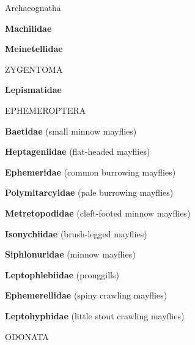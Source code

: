 \documentclass[letterpaper,10pt]{article}
\begin{document}
	
\newcommand*{\mybox}[1]{\framebox{#1}}	

\scriptsize{

%
%
%

%
%
%
\makebox[0.0cm]{}  Archaeognatha \par

\makebox[0.6cm]{}  \textbf{Machilidae} \par
\makebox[0.6cm]{}  \textbf{Meinetellidae} \par
%
%
%
\makebox[0.0cm]{}  ZYGENTOMA \par
\makebox[0.6cm]{}  \textbf{Lepismatidae} \par
%
%
%
\makebox[0.0cm]{}  EPHEMEROPTERA \par
\makebox[0.6cm]{}  \textbf{Baetidae} (small minnow mayflies) \par
\makebox[0.6cm]{}  \textbf{Heptageniidae} (flat-headed mayflies) \par
\makebox[0.6cm]{}  \textbf{Ephemeridae} (common burrowing mayflies) \par
\makebox[0.6cm]{}  \textbf{Polymitarcyidae} (pale burrowing mayflies) \par
\makebox[0.6cm]{}  \textbf{Metretopodidae} (cleft-footed minnow mayflies) \par
\makebox[0.6cm]{}  \textbf{Isonychiidae} (brush-legged mayflies) \par
\makebox[0.6cm]{}  \textbf{Siphlonuridae} (minnow mayflies) \par
\makebox[0.6cm]{}  \textbf{Leptophlebiidae} (pronggills) \par
\makebox[0.6cm]{}  \textbf{Ephemerellidae} (spiny crawling mayflies) \par
\makebox[0.6cm]{}  \textbf{Leptohyphidae} (little stout crawling mayflies) \par
%
%
%
\makebox[0.0cm]{}  ODONATA \par

}
\end{document}
